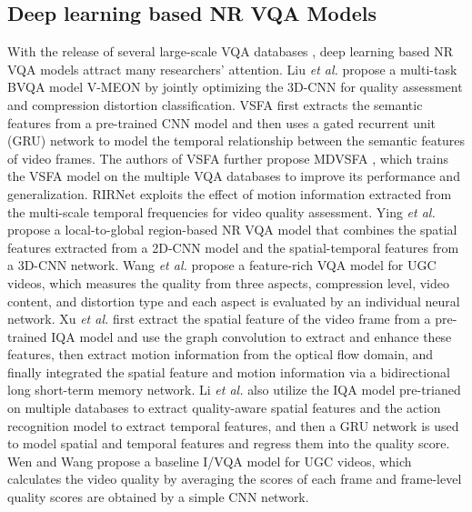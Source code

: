 \documentclass[sigconf]{acmart}
\begin{document}
\subsection{Deep learning based NR VQA Models}
With the release of several large-scale VQA databases \cite{hosu2017konstanz,wang2019youtube,ying2021patch}, deep learning based NR VQA models \cite{kim2018deep, li2019quality, ying2021patch, wang2021rich, xu2021perceptual, li2021blindly, sun2021deep, yi2021attention, cao2021deep} attract many researchers' attention. Liu \textit{et al.} \cite{liu2018end} propose a multi-task BVQA model V-MEON by jointly optimizing the 3D-CNN for quality assessment and compression distortion classification. VSFA \cite{li2019quality} first extracts the semantic features from a pre-trained CNN model and then uses a gated recurrent unit (GRU) network to model the temporal relationship between the semantic features of video frames. 
The authors of VSFA further propose MDVSFA \cite{li2021unified}, which trains the VSFA model on the multiple VQA databases to improve its performance and generalization. 
RIRNet \cite{chen2020rirnet} exploits the effect of motion information extracted from the multi-scale temporal frequencies for video quality assessment. 
Ying \textit{et al.} \cite{ying2021patch} propose a local-to-global region-based NR VQA model that combines the spatial features extracted from a 2D-CNN model and the spatial-temporal features from a 3D-CNN network. Wang \textit{et al.} \cite{wang2021rich} propose a feature-rich VQA model for UGC videos, which measures the quality from three aspects, compression level, video content, and distortion type and each aspect is evaluated by an individual neural network. 
Xu \textit{et al.} \cite{xu2021perceptual} first extract the spatial feature of the video frame from a pre-trained IQA model and use the graph convolution to extract and enhance these features, then extract motion information from the optical flow domain, and finally integrated the spatial feature and motion information via a bidirectional long short-term memory network. 
Li \textit{et al.} \cite{li2021blindly} also utilize the IQA model pre-trianed on multiple databases to extract quality-aware spatial features and the action recognition model to extract temporal features, and then a GRU network is used to model spatial and temporal features and regress them into the quality score.  Wen and Wang \cite{wen2021strong} propose a baseline I/VQA model for UGC videos, which calculates the video quality by averaging the scores of each frame and frame-level quality scores are obtained by a simple CNN network.
\end{document}
